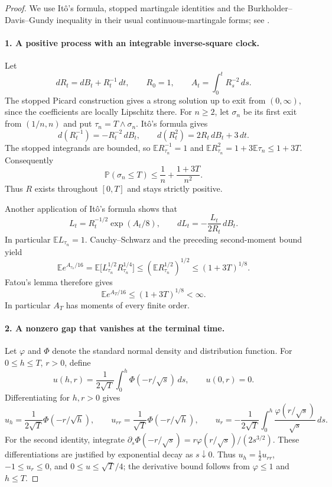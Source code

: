 \documentclass[11pt]{article}
\newcommand{\E}{\mathbb E}
\newcommand{\Prob}{\mathbb P}
\begin{document}
\begin{proof}
We use It\^o's formula, stopped martingale identities and the
Burkholder--Davis--Gundy inequality in their usual continuous-martingale
forms; see \cite[Chapters~IV and IX]{RY}.

\paragraph{1. A positive process with an integrable inverse-square clock.}
Let
\begin{equation}\label{bessel}
 dR_t=dB_t+R_t^{-1}\,dt,\qquad R_0=1,
 \qquad A_t=\int_0^tR_s^{-2}\,ds.
\end{equation}
The stopped Picard construction gives a strong solution up to exit from
$(0,\infty)$, since the coefficients are locally Lipschitz there.
For $n\ge2$, let $\sigma_n$ be its first exit from $(1/n,n)$ and put
$\tau_n=T\wedge\sigma_n$. It\^o's formula gives
\[
 d(R_t^{-1})=-R_t^{-2}\,dB_t,
 \qquad d(R_t^2)=2R_t\,dB_t+3\,dt.
\]
The stopped integrands are bounded, so
$\E R_{\tau_n}^{-1}=1$ and
$\E R_{\tau_n}^{2}=1+3\E\tau_n\le1+3T$. Consequently
\[
 \Prob(\sigma_n\le T)\le \frac1n+\frac{1+3T}{n^2}.
\]
Thus $R$ exists throughout $[0,T]$ and stays strictly positive.

Another application of It\^o's formula shows that
\[
 L_t=R_t^{-1/2}\exp(A_t/8),\qquad
 dL_t=-\frac{L_t}{2R_t}\,dB_t.
\]
In particular $\E L_{\tau_n}=1$. Cauchy--Schwarz and the preceding
second-moment bound yield
\[
 \E e^{A_{\tau_n}/16}
 =\E\bigl[L_{\tau_n}^{1/2}R_{\tau_n}^{1/4}\bigr]
 \le(\E R_{\tau_n}^{1/2})^{1/2}
 \le(1+3T)^{1/8}.
\]
Fatou's lemma therefore gives
\begin{equation}\label{clock}
 \E e^{A_T/16}\le(1+3T)^{1/8}<\infty.
\end{equation}
In particular $A_T$ has moments of every finite order.

\paragraph{2. A nonzero gap that vanishes at the terminal time.}
Let $\varphi$ and $\Phi$ denote the standard normal density and
distribution function. For $0\le h\le T$, $r>0$, define
\begin{equation}\label{u}
 u(h,r)=\frac1{2\sqrt T}\int_0^h\Phi(-r/\sqrt s)\,ds,
 \qquad u(0,r)=0.
\end{equation}
Differentiating for $h,r>0$ gives
\[
 u_h=\frac1{2\sqrt T}\Phi(-r/\sqrt h),\qquad
 u_{rr}=\frac1{\sqrt T}\Phi(-r/\sqrt h),\qquad
 u_r=-\frac1{2\sqrt T}\int_0^h
             \frac{\varphi(r/\sqrt s)}{\sqrt s}\,ds.
\]
For the second identity, integrate
$\partial_s\Phi(-r/\sqrt s)
 =r\varphi(r/\sqrt s)/(2s^{3/2})$.
These differentiations are justified by exponential decay as $s\downarrow0$.
Thus $u_h=\tfrac12u_{rr}$, $-1\le u_r\le0$, and
$0\le u\le\sqrt T/4$; the derivative bound follows from
$\varphi\le1$ and $h\le T$.


\end{proof}
\end{document}
